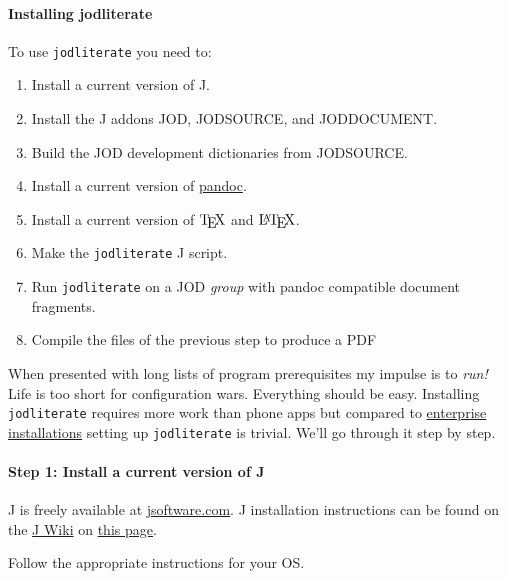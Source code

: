     \hypertarget{installing-jodliterate}{%
\paragraph{Installing jodliterate}\label{installing-jodliterate}}

To use \texttt{jodliterate} you need to:

\begin{enumerate}
\def\labelenumi{\arabic{enumi}.}
\tightlist
\item
  Install a current version of J.
\item
  Install the J addons JOD, JODSOURCE, and JODDOCUMENT.
\item
  Build the JOD development dictionaries from JODSOURCE.
\item
  Install a current version of \href{https://pandoc.org/}{pandoc}.
\item
  Install a current version of \(\TeX\) and \(\LaTeX\).
\item
  Make the \texttt{jodliterate} J script.
\item
  Run \texttt{jodliterate} on a JOD \emph{group} with pandoc compatible
  document fragments.
\item
  Compile the files of the previous step to produce a PDF
\end{enumerate}

When presented with long lists of program prerequisites my impulse is to
\emph{run!} Life is too short for configuration wars. Everything should
be easy. Installing \texttt{jodliterate} requires more work than phone
apps but compared to
\href{https://www.cio.com/article/2429865/enterprise-resource-planning-10-famous-erp-disasters-dustups-and-disappointments.html}{enterprise
installations} setting up \texttt{jodliterate} is trivial. We'll go
through it step by step.

    \hypertarget{step-1-install-a-current-version-of-j}{%
\paragraph{Step 1: Install a current version of
J}\label{step-1-install-a-current-version-of-j}}

J is freely available at
\href{https://www.jsoftware.com}{jsoftware.com}. J installation
instructions can be found on the
\href{https://code.jsoftware.com/wiki/Main_Page}{J Wiki} on
\href{https://code.jsoftware.com/wiki/System/Installation}{this page}.

Follow the appropriate instructions for your OS.

